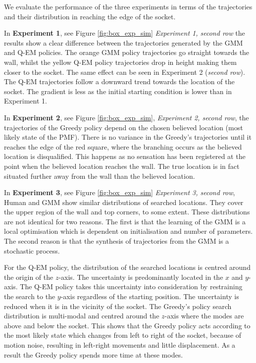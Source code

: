 We evaluate the performance of the three experiments in terms of the trajectories and their distribution in reaching 
the edge of the socket. 

In \textbf{Experiment 1}, see Figure \ref{fig:box_exp_sim} \textit{Experiment 1, second row} the results show 
a clear difference between the trajectories generated by the GMM and Q-EM policies. The orange GMM policy trajectories 
go straight towards the wall, whilst the yellow Q-EM policy trajectories drop in height making them closer 
to the socket. The same effect can be seen in Experiment 2 (\textit{second row}). The Q-EM trajectories 
follow a downward trend towards the location of the socket. The gradient is less as the initial starting condition is 
lower than in Experiment 1. 

In \textbf{Experiment 2}, see Figure \ref{fig:box_exp_sim}, \textit{Experiment 2, second row}, 
the trajectories of the Greedy policy depend on the chosen believed location (most likely state of the PMF). There 
is no variance in the Greedy's trajectories until it reaches the edge of the red square, where the branching 
occurs as the believed location is disqualified. This happens as no sensation has been registered at the point 
when the believed location reaches the wall. The true location is in fact situated further away from the wall 
than the believed location.

In \textbf{Experiment 3}, see Figure \ref{fig:box_exp_sim} \textit{Experiment 3, second row}, Human and GMM show 
similar distributions of searched locations. They cover the upper region of the wall and top corners, to 
some extent. These distributions are not identical for two reasons. The first is that the learning of the GMM is a 
local optimisation which is dependent on initialisation and number of parameters. The second reason is that 
the synthesis of trajectories from the GMM is a stochastic process. 

For the  Q-EM policy, the distribution of the searched locations is centred around the origin of the $z$-axis.
The uncertainty is predominantly located in the $x$ and $y$-axis. The Q-EM policy takes this uncertainty 
into consideration by restraining the search to the $y$-axis regardless of the starting position. The uncertainty 
is reduced when it is in the vicinity of the socket. 
The Greedy's policy search distribution is multi-modal and centred around the $z$-axis where the modes are above 
and below the socket. This shows that the Greedy policy acts according to the most likely state 
which changes from left to right of the socket, because of motion noise, resulting in left-right 
movements and little displacement. As a result the Greedy policy spends more time at these modes.

